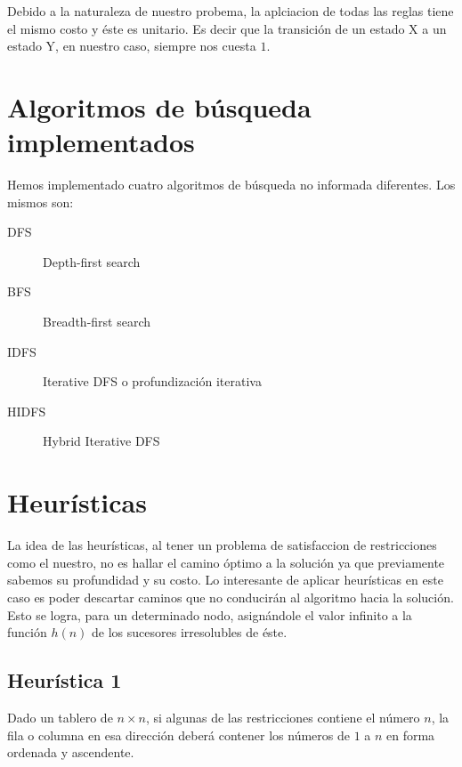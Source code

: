 \documentclass[%
	final,
	reprint,
	notitlepage,
	narroweqnarray,
	inline,
	twoside,
	invited
	]{ieee}
\begin{document}
\par Debido a la naturaleza de nuestro probema, la aplciacion de todas las reglas tiene el mismo costo y éste es unitario. Es decir que la transición de un estado X a un estado Y, en nuestro caso, siempre nos cuesta $1$.

\section{Algoritmos de búsqueda implementados}

\par Hemos implementado cuatro algoritmos de búsqueda no informada diferentes. Los mismos son:

\begin{description}

\item[DFS]
Depth-first search

\item[BFS]
Breadth-first search

\item[IDFS]
Iterative DFS o profundización iterativa

\item[HIDFS]
Hybrid Iterative DFS

\end{description}

\section{Heurísticas}

\par La idea de las heurísticas, al tener un problema de satisfaccion de restricciones como el nuestro, no es hallar el camino óptimo a la solución ya que previamente sabemos su profundidad y su costo. Lo interesante de aplicar heurísticas en este caso es poder descartar caminos que no conducirán al algoritmo hacia la solución. Esto se logra, para un determinado nodo, asignándole el valor infinito a la función $h(n)$ de los sucesores irresolubles de éste.\\

\subsection{Heurística 1}
\par Dado un tablero de $n\times n$, si algunas de las restricciones contiene el número $n$, la fila o columna en esa dirección deberá contener los números de $1$ a $n$ en forma ordenada y ascendente.
\end{document}
